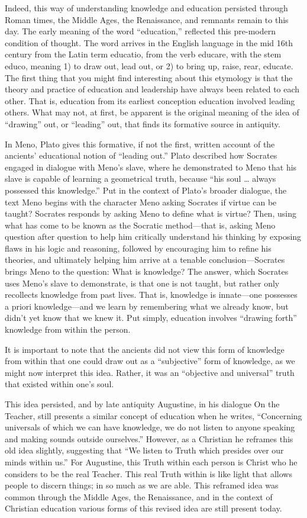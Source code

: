 \documentclass[
]{book}
\begin{document}
Indeed, this way of understanding knowledge and education persisted through Roman times, the Middle Ages, the Renaissance, and remnants remain to this day. The early meaning of the word ``education,'' reflected this pre-modern condition of thought. The word arrives in the English language in the mid 16th century from the Latin term educatio, from the verb educare, with the stem educo, meaning 1) to draw out, lead out, or 2) to bring up, raise, rear, educate. The first thing that you might find interesting about this etymology is that the theory and practice of education and leadership have always been related to each other. That is, education from its earliest conception education involved leading others. What may not, at first, be apparent is the original meaning of the idea of ``drawing'' out, or ``leading'' out, that finds its formative source in antiquity.

In Meno, Plato gives this formative, if not the first, written account of the ancients' educational notion of ``leading out.'' Plato described how Socrates engaged in dialogue with Meno's slave, where he demonstrated to Meno that his slave is capable of learning a geometrical truth, because ``his soul \ldots{} always possessed this knowledge.'' Put in the context of Plato's broader dialogue, the text Meno begins with the character Meno asking Socrates if virtue can be taught? Socrates responds by asking Meno to define what is virtue? Then, using what has come to be known as the Socratic method---that is, asking Meno question after question to help him critically understand his thinking by exposing flaws in his logic and reasoning, followed by encouraging him to refine his theories, and ultimately helping him arrive at a tenable conclusion---Socrates brings Meno to the question: What is knowledge? The answer, which Socrates uses Meno's slave to demonstrate, is that one is not taught, but rather only recollects knowledge from past lives. That is, knowledge is innate---one possesses a priori knowledge---and we learn by remembering what we already know, but didn't yet know that we knew it. Put simply, education involves ``drawing forth'' knowledge from within the person.

It is important to note that the ancients did not view this form of knowledge from within that one could draw out as a ``subjective'' form of knowledge, as we might now interpret this idea. Rather, it was an ``objective and universal'' truth that existed within one's soul.

This idea persisted, and by late antiquity Augustine, in his dialogue On the Teacher, still presents a similar concept of education when he writes, ``Concerning universals of which we can have knowledge, we do not listen to anyone speaking and making sounds outside ourselves.'' However, as a Christian he reframes this old idea slightly, suggesting that ``We listen to Truth which presides over our minds within us.'' For Augustine, this Truth within each person is Christ who he considers to be the real Teacher. This real Truth within is like light that allows people to discern things; in so much as we are able. This reframed idea was common through the Middle Ages, the Renaissance, and in the context of Christian education various forms of this revised idea are still present today.
\end{document}
